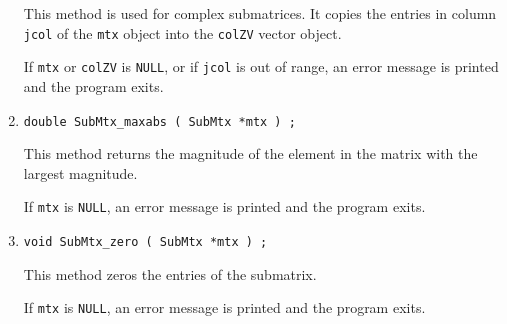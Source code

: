 \begin{enumerate}
This method is used for complex submatrices.
It copies the entries in column {\tt jcol} of the {\tt mtx} object
into the {\tt colZV} vector object.
\par {}
If {\tt mtx} or {\tt colZV} is {\tt NULL},
or if {\tt jcol} is out of range,
an error message is printed and the program exits.
\item
\begin{verbatim}
double SubMtx_maxabs ( SubMtx *mtx ) ;
\end{verbatim}
This method returns the magnitude of the element in the matrix
with the largest magnitude.
\par {}
If {\tt mtx} is {\tt NULL},
an error message is printed and the program exits.
\item
\begin{verbatim}
void SubMtx_zero ( SubMtx *mtx ) ;
\end{verbatim}
This method zeros the entries of the submatrix.
\par {}
If {\tt mtx} is {\tt NULL},
an error message is printed and the program exits.
\end{enumerate}
\par
